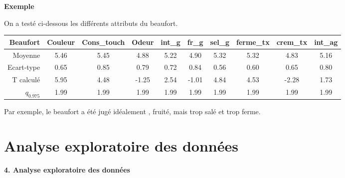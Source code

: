 \documentclass[aspectratio=169,xcolor=dvipsnames]{beamer}
\begin{document}
\begin{frame}
	\begin{exampleblock}{\textbf{Exemple}}
	\begin{scriptsize}
	On a testé ci-dessous les différents attributs du beaufort.
	
\begin{center}
\begin{tabular}{r|ccccccccc}
Beaufort & Couleur & Cons\_touch & Odeur & int\_g & fr\_g & sel\_g & ferme\_tx & crem\_tx & int\_ag \\ 
\hline
  Moyenne & 5.46 & 5.45 & 4.88 & 5.22 & 4.90 & 5.32 & 5.32 & 4.83 & 5.16 \\ 
  Ecart-type & 0.65 & 0.85 & 0.79 & 0.72 & 0.84 & 0.56 & 0.60 & 0.65 & 0.80 \\ 
  T calculé &  5.95 &  4.48 & -1.25 &  2.54 & -1.01 &  4.84 &  4.53 & -2.28 &  1.73 \\ 
  $q_{0.975}$ & 1.99 & 1.99 & 1.99 & 1.99 &  1.99 &  1.99 &  1.99 &  1.99 &  1.99
\end{tabular}
\end{center}

	Par exemple, le beaufort a été jugé \og idéalement \fg{}, fruité, mais trop salé et trop ferme.
	\end{scriptsize}
	\end{exampleblock}
\end{frame}

\section{Analyse exploratoire des données}

\begin{frame}[plain]

\vfill

\begin{center}
{\huge \textcolor{nyubluedark}{\textbf{4. Analyse exploratoire des données}}}
\end{center}

\vfill

\end{frame}
\end{document}
